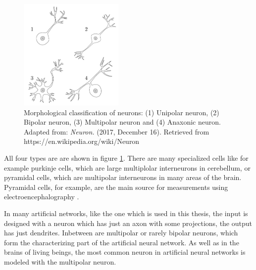 \begin{figure}
	\centering
	\includegraphics[width=0.45\textwidth]{neurons_plasticity/neuron_types}
	\caption[Morphological classification of neurons]{Morphological classification of neurons: (1) Unipolar neuron, (2) Bipolar neuron, (3) Multipolar neuron and (4) Anaxonic neuron.\\ Adapted from: \emph{Neuron.} (2017, December 16). Retrieved from https://en.wikipedia.org/wiki/Neuron}
    \vspace{10pt}
    \label{sec:neuron-types}
\end{figure}

All four types are are shown in figure \ref{sec:neuron-types}. There are many specialized cells like for example purkinje cells, which are large multiplolar interneurons in cerebellum, or pyramidal cells, which are multipolar interneurons in many areas of the brain. Pyramidal cells, for example, are the main source for measurements using electroencephalography \parencite{kirschstein2009source}.

In many artificial networks, like the one which is used in this thesis, the input is designed with a neuron which has just an axon with some projections, the output has just dendrites. Inbetween are multipolar or rarely bipolar neurons, which form the characterizing part of the artificial neural network. As well as in the brains of living beings, the most common neuron in artificial neural networks is modeled with the multipolar neuron.
